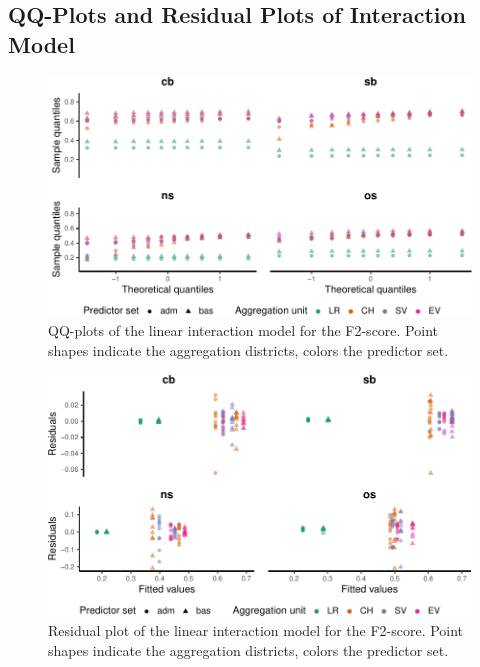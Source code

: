 \documentclass[a4paper,11pt]{article}
\begin{document}
\hypertarget{qq-plots-and-residual-plots-of-interaction-model}{%
\subsection*{QQ-Plots and Residual Plots of Interaction Model}\label{qq-plots-and-residual-plots-of-interaction-model}}
\begin{figure}[H]

{\centering \includegraphics{thesis_files/figure-latex/appendix-anova-qq-1} 

}

\caption[QQ-plots of the linear interaction model for the F2-score.]{QQ-plots of the linear interaction model for the F2-score. Point shapes indicate the aggregation districts, colors the predictor set.}\label{fig:appendix-anova-qq}
\end{figure}
\begin{figure}[H]

{\centering \includegraphics{thesis_files/figure-latex/appendix-anova-resid-1} 

}

\caption[Residual plot of the linear interaction model for the F2-score.]{Residual plot of the linear interaction model for the F2-score. Point shapes indicate the aggregation districts, colors the predictor set.}\label{fig:appendix-anova-resid}
\end{figure}
\newpage
\end{document}
